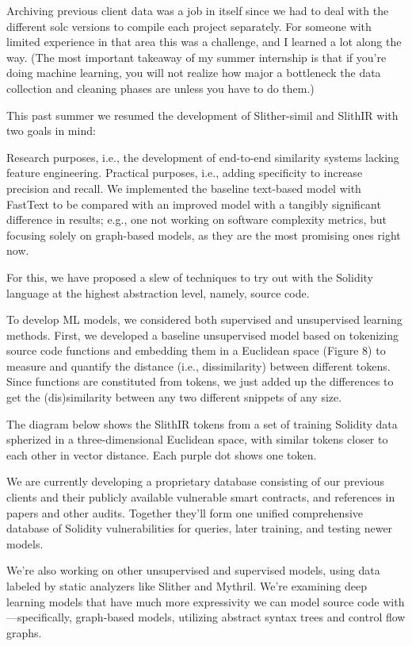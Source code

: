 Archiving previous client data was a job in itself since we had to deal with the different solc versions to compile each project separately.
For someone with limited experience in that area this was a challenge, and I learned a lot along the way.
(The most important takeaway of my summer internship is that if you're doing machine
learning, you will not realize how major a bottleneck the data collection and cleaning phases are unless you have to do them.)

This past summer we resumed the development of Slither-simil and SlithIR with two goals in mind:

Research purposes, i.e., the development of end-to-end similarity systems lacking feature engineering.
Practical purposes, i.e., adding specificity to increase precision and recall.
We implemented the baseline text-based model with FastText to be compared with an improved model with a tangibly significant difference in results;
e.g., one not working on software complexity metrics, but focusing solely on graph-based models, as they are the most promising ones right now.

For this, we have proposed a slew of techniques to try out with the Solidity language at the highest abstraction level, namely, source code.

To develop ML models, we considered both supervised and unsupervised learning methods.
First, we developed a baseline unsupervised model based on tokenizing source code functions and embedding them in a Euclidean space
(Figure 8) to measure and quantify the distance (i.e., dissimilarity) between different tokens.
Since functions are constituted from tokens, we just added up the differences to get the (dis)similarity between any two different snippets of any size.

The diagram below shows the SlithIR tokens from a set of training Solidity data spherized in a three-dimensional Euclidean space, with similar tokens closer to each other in vector distance.
Each purple dot shows one token.

We are currently developing a proprietary database consisting of our previous clients and their publicly available vulnerable smart contracts, and references in papers and other audits.
Together they'll form one unified comprehensive database of Solidity vulnerabilities for queries, later training, and testing newer models.

We're also working on other unsupervised and supervised models, using data labeled by static analyzers like Slither and Mythril.
We're examining deep learning models that have much more expressivity we can model source code with—specifically, graph-based models, utilizing abstract syntax trees and control flow graphs.

